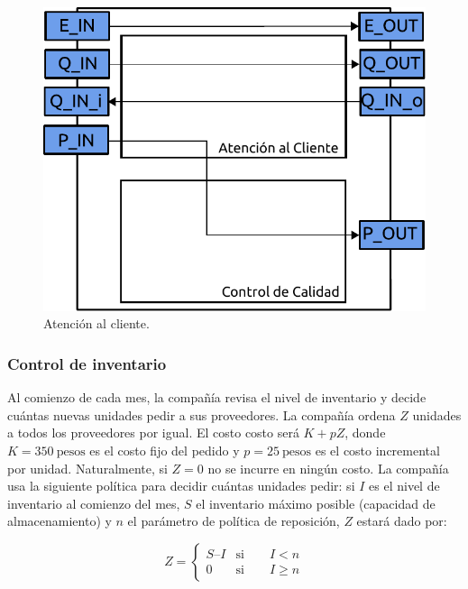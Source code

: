 \documentclass[10pt]{article}
\begin{document}
\begin{figure}[h]
\centering
\includegraphics[scale=0.8]{img/figura5}
\caption{Atención al cliente.}
\label{fig:fig5}
\end{figure}
\FloatBarrier

\subsubsection{Control de inventario\label{sec:CID}}

Al comienzo de cada mes, la compañía revisa el nivel de inventario y decide cuántas nuevas unidades pedir a sus proveedores. La compañía ordena $Z$ unidades a todos los proveedores por igual. El costo costo será $K + pZ$, donde $K = 350~\textrm{pesos}$ es el costo fijo del pedido y $p = 25~\textrm{pesos}$ es el costo incremental por unidad. Naturalmente, si $Z = 0$ no se incurre en ningún costo. La compañía usa la siguiente política para decidir cuántas unidades pedir: si $I$ es el nivel de inventario al comienzo del mes, $S$ el inventario máximo posible (capacidad de almacenamiento) y $n$ el parámetro de política de reposición, $Z$ estará dado por:

\begin{equation}
Z=\left\{\begin{array}{lr}
		S – I & \textrm{si}\qquad I < n\\
		0 & \textrm{si} \qquad I \geq n
	\end{array}\right.
\label{eq:ctrlinv}
\end{equation}
\end{document}
